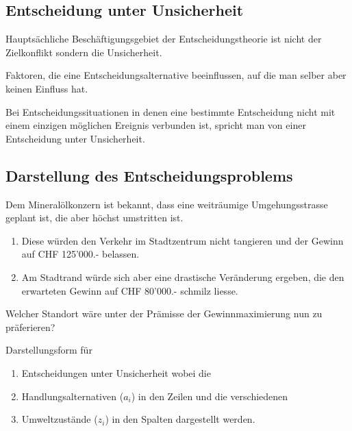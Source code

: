 \documentclass[
	final,
	a4paper,
	oneside,
	parskip=full,
	headings=standardclasses,
	headings=big,
	pointednumbers
]{scrartcl}
\newcommand{\txb}[1]{{\color{blue}#1}}
\newcommand{\txr}[1]{{\color{red}#1}}
\newcommand{\txgr}[1]{{\color{grey}#1}}
\begin{document}
    \subsection*{Entscheidung unter Unsicherheit}

        Hauptsächliche Beschäftigungsgebiet der \txgr{Entscheidungstheorie} ist \txr{nicht} der
        \txb{Zielkonflikt} sondern die \txb{Unsicherheit}.

        Faktoren, die eine \txgr{Entscheidungsalternative} beeinflussen,
        auf die man selber aber \txr{keinen Einfluss} hat.

        Bei \txgr{Entscheidungssituationen} in denen eine bestimmte \txgr{Entscheidung} \txr{nicht
        mit einem einzigen} möglichen \txb{Ereignis} verbunden ist,
        spricht man von einer \txgr{Entscheidung unter Unsicherheit}.
	
	\subsection*{Darstellung des Entscheidungsproblems}


        Dem Mineralölkonzern ist bekannt, dass eine weiträumige Umgehungsstrasse
        geplant ist, die aber \txr{höchst umstritten} ist.

        \begin{enumerate}[label=$\bullet$]
            \setlength{\parskip}{1mm}
            \item Diese würden den Verkehr im \txgr{Stadtzentrum} \txr{nicht}
                  tangieren und der \txb{Gewinn} auf CHF 125’000.- belassen.
            \item Am \txgr{Stadtrand} würde sich aber eine \txr{drastische Veränderung} ergeben,
                  die den erwarteten \txb{Gewinn} auf CHF 80’000.- schmilz liesse.
        \end{enumerate}

        Welcher Standort wäre unter der Prämisse der Gewinnmaximierung nun zu präferieren?

        Darstellungsform für

        \begin{enumerate}[label=$\bullet$]
            \setlength{\parskip}{1mm}
            \item \txgr{Entscheidungen unter Unsicherheit} wobei die
            \item \txb{Handlungsalternativen} ($a_i$) in den \txr{Zeilen} und die verschiedenen
            \item \txb{Umweltzustände} ($z_i$) in den \txr{Spalten} dargestellt werden.
        \end{enumerate}
        
\end{document}
